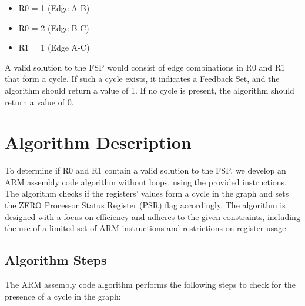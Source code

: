 \begin{itemize}
    \item R0 = 1 (Edge A-B)
    \item R0 = 2 (Edge B-C)
    \item R1 = 1 (Edge A-C)
\end{itemize}

A valid solution to the FSP would consist of edge combinations in R0 and R1 that form a cycle. If such a cycle exists, it indicates a Feedback Set, and the algorithm should return a value of 1. If no cycle is present, the algorithm should return a value of 0.

\section{Algorithm Description}

To determine if R0 and R1 contain a valid solution to the FSP, we develop an ARM assembly code algorithm without loops, using the provided instructions. The algorithm checks if the registers' values form a cycle in the graph and sets the ZERO Processor Status Register (PSR) flag accordingly. The algorithm is designed with a focus on efficiency and adheres to the given constraints, including the use of a limited set of ARM instructions and restrictions on register usage.

\subsection{Algorithm Steps}

The ARM assembly code algorithm performs the following steps to check for the presence of a cycle in the graph:

